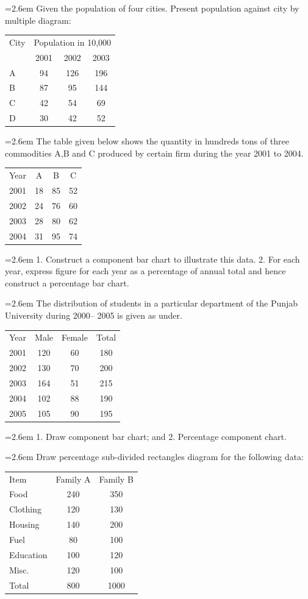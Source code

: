 \documentclass[11pt,a4paper]{article}
\newcommand{\Q}[2]{\par\smallskip\noindent\hangindent=2.6em\hangafter=1
  \makebox[2.6em][l]{\textbf{#1.}}#2\par}
\newcommand{\cont}[1]{\par\noindent\hangindent=2.6em\hangafter=-100 #1}
\newcommand{\dtab}[2]{\par\smallskip\noindent\hspace*{2.6em}\begin{tabular}{#1}\hline #2\\ \hline\end{tabular}\par\smallskip}
\begin{document}
\Q{17}{Given the population of four cities. Present population against city by multiple diagram:\dtab{|l@{\hspace{3em}}c@{\hspace{3em}}c@{\hspace{3em}}c|}{City & \multicolumn{3}{c}{Population in 10,000} \\  & 2001 & 2002 & 2003 \\ A & 94 & 126 & 196 \\ B & 87 & 95 & 144 \\ C & 42 & 54 & 69 \\ D & 30 & 42 & 52}}
\Q{18}{The table given below shows the quantity in hundreds tons of three commodities A,B and C produced by certain firm during the year 2001 to 2004.\dtab{|l@{\hspace{3em}}c@{\hspace{3em}}c@{\hspace{3em}}c|}{Year & A & B & C \\ 2001 & 18 & 85 & 52 \\ 2002 & 24 & 76 & 60 \\ 2003 & 28 & 80 & 62 \\ 2004 & 31 & 95 & 74}\cont{1. Construct a component bar chart to illustrate this data. 2. For each year, express figure for each year as a percentage of annual total and hence construct a percentage bar chart.}}
\Q{19}{The distribution of students in a particular department of the Punjab University during 2000-- 2005 is given as under.\dtab{|l@{\hspace{3em}}c@{\hspace{3em}}c@{\hspace{3em}}c|}{Year & Male & Female & Total \\ 2001 & 120 & 60 & 180 \\ 2002 & 130 & 70 & 200 \\ 2003 & 164 & 51 & 215 \\ 2004 & 102 & 88 & 190 \\ 2005 & 105 & 90 & 195}\cont{1. Draw component bar chart; and 2. Percentage component chart.}}
\Q{20}{Draw percentage sub-divided rectangles diagram for the following data:\dtab{|l@{\hspace{3em}}c@{\hspace{3em}}c|}{Item & Family A & Family B \\ Food & 240 & 350 \\ Clothing & 120 & 130 \\ Housing & 140 & 200 \\ Fuel & 80 & 100 \\ Education & 100 & 120 \\ Misc. & 120 & 100 \\ Total & 800 & 1000}}
\end{document}
